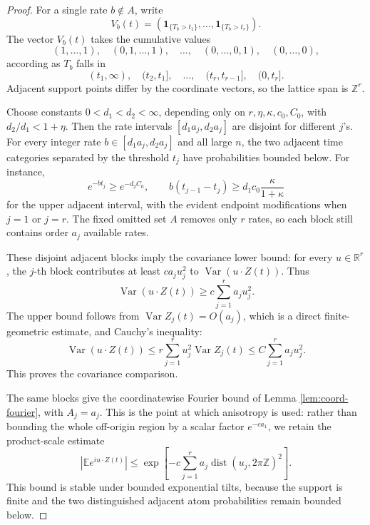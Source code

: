 \documentclass[11pt]{article}
\theoremstyle{remark}
\newcommand{\Ee}{\mathbb E}
\newcommand{\Rr}{\mathbb R}
\newcommand{\one}{\mathbf 1}
\newcommand{\Var}{\operatorname{Var}}
\begin{document}
\begin{proof}
For a single rate \(b\notin A\), write
\[
        V_b(t)=(\one_{\{T_b>t_1\}},\ldots,\one_{\{T_b>t_r\}}).
\]
The vector \(V_b(t)\) takes the cumulative values
\[
        (1,\ldots,1),\quad (0,1,\ldots,1),\quad\ldots,
        \quad (0,\ldots,0,1),\quad (0,\ldots,0),
\]
according as \(T_b\) falls in
\[
        (t_1,\infty),\quad (t_2,t_1],\quad\ldots,
        \quad(t_r,t_{r-1}],\quad (0,t_r].
\]
Adjacent support points differ by the coordinate vectors, so the lattice span is \(\mathbb Z^r\).

Choose constants \(0<d_1<d_2<\infty\), depending only on
\(r,\eta,\kappa,c_0,C_0\), with \(d_2/d_1<1+\eta\).  Then the rate intervals
\([d_1a_j,d_2a_j]\) are disjoint for different \(j\)'s.  For every integer rate \(b\in[d_1a_j,d_2a_j]\) and all large \(n\), the two adjacent time categories separated by the threshold \(t_j\) have probabilities bounded below.  For instance,
\[
        e^{-bt_j}\ge e^{-d_2C_0},
        \qquad
        b(t_{j-1}-t_j)\ge d_1c_0\frac{\kappa}{1+\kappa}
\]
for the upper adjacent interval, with the evident endpoint modifications when \(j=1\) or \(j=r\).  The fixed omitted set \(A\) removes only \(r\) rates, so each block still contains order \(a_j\) available rates.

These disjoint adjacent blocks imply the covariance lower bound: for every \(u\in\Rr^r\), the \(j\)-th block contributes at least \(c a_j u_j^2\) to \(\Var(u\cdot Z(t))\).  Thus
\[
        \Var(u\cdot Z(t))\ge c\sum_{j=1}^r a_j u_j^2 .
\]
The upper bound follows from \(\Var Z_j(t)=O(a_j)\), which is a direct finite-geometric estimate, and Cauchy's inequality:
\[
        \Var(u\cdot Z(t))
        \le r\sum_{j=1}^r u_j^2\Var Z_j(t)
        \le C\sum_{j=1}^r a_j u_j^2 .
\]
This proves the covariance comparison.

The same blocks give the coordinatewise Fourier bound of Lemma \ref{lem:coord-fourier}, with \(A_j=a_j\).  This is the point at which anisotropy is used: rather than bounding the whole off-origin region by a scalar factor \(e^{-ca_1}\), we retain the product-scale estimate
\[
        |\Ee e^{iu\cdot Z(t)}|
        \le \exp\left[-c\sum_{j=1}^r
        a_j\operatorname{dist}(u_j,2\pi\mathbb Z)^2\right].
\]
This bound is stable under bounded exponential tilts, because the support is finite and the two distinguished adjacent atom probabilities remain bounded below.


\end{proof}
\end{document}
